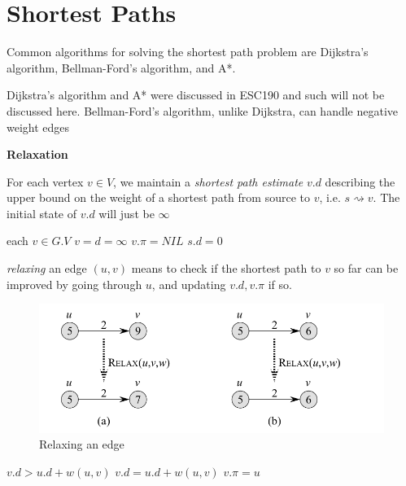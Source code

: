 \documentclass[../notes.tex]{subfiles}
\begin{document}
\section{Shortest Paths}

Common algorithms for solving the shortest path problem are Dijkstra's algorithm, Bellman-Ford's algorithm, and A*.

Dijkstra's algorithm and A* were discussed in ESC190 and such will not be discussed here. Bellman-Ford's algorithm, unlike Dijkstra, can handle negative weight edges

\begin{definition}
	\textbf{Relaxation} 

	For each vertex $ v \in V $, we maintain a \textit{shortest path estimate} $ v.d $ describing the upper bound on the weight of a shortest path from source to $ v $, i.e. $ s \rightsquigarrow v $. The initial state of $ v.d $ will just be $ \infty $

	\begin{codebox}
	\li \For each $ v \in G.V $ \Do
	\li $ v=d = \infty $
	\li $ v.\pi = NIL $ \End
	\li $ s.d = 0 $
	\end{codebox}

	\textit{relaxing} an edge $ (u,v) $ means to check if the shortest path to $ v $ so far can be improved by going through $ u $, and updating $ v.d, v.\pi $ if so.
	\begin{figure}[H]
		\centering
		\includegraphics[width=0.8\linewidth]{img/image_2022-11-23-21-46-25.png}
		\caption{Relaxing an edge}
	\end{figure}

	\begin{codebox}
	\Procname{$\proc{relax}(u,v,w)$}
	\li	\If $ v.d > u.d + w(u,v)$ \Then
	\li	$ v.d = u.d + w(u,v) $
	\li	$ v.\pi = u $ \End
	\end{codebox}
\end{definition}
\end{document}

